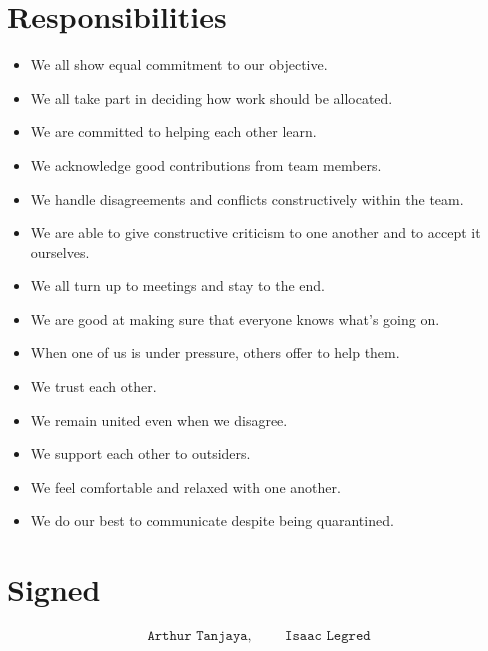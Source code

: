 \documentclass{article}
\begin{document}
\section{Responsibilities}

\begin{itemize}
\item We all show equal commitment to our objective.
\item We all take part in deciding how work should be allocated.
\item We are committed to helping each other learn.
\item We acknowledge good contributions from team members.
\item We handle disagreements and conflicts constructively within the team.
\item We are able to give constructive criticism to one another and to accept it ourselves.
\item We all turn up to meetings and stay to the end.
\item We are good at making sure that everyone knows what’s going on.
\item When one of us is under pressure, others offer to help them.
\item We trust each other.
\item We remain united even when we disagree.
\item We support each other to outsiders.
\item We feel comfortable and relaxed with one another.
\item We do our best to communicate despite being quarantined. 
\end{itemize}

\section*{Signed}

\Huge
\begin{align*}
\texttt{Arthur Tanjaya},
& & &
\texttt{Isaac Legred}
\end{align*}
\end{document}
